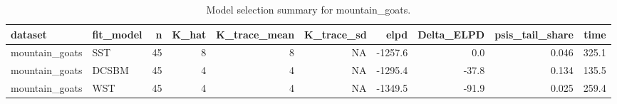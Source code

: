 \begin{table}

\caption{\label{tab:tab:model_selection_mountain_goats}Model selection summary for mountain_goats.}
\centering
\begin{tabular}[t]{llrrrrrrrr}
\toprule
dataset & fit\_model & n & K\_hat & K\_trace\_mean & K\_trace\_sd & elpd & Delta\_ELPD & psis\_tail\_share & time\\
\midrule
mountain\_goats & SST & 45 & 8 & 8 & NA & -1257.6 & 0.0 & 0.046 & 325.1\\
mountain\_goats & DCSBM & 45 & 4 & 4 & NA & -1295.4 & -37.8 & 0.134 & 135.5\\
mountain\_goats & WST & 45 & 4 & 4 & NA & -1349.5 & -91.9 & 0.025 & 259.4\\
\bottomrule
\end{tabular}
\end{table}

